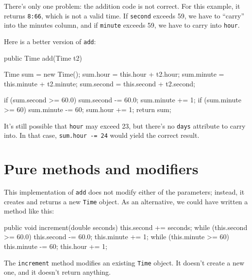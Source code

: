 \documentclass[12pt]{book}
\theoremstyle{exercise}
\newcommand{\java}[1]{\verb"#1"}
\begin{document}


There's only one problem: the addition code is not correct.
For this example, it returns {\tt 8:66}, which is not a valid time.
If \java{second} exceeds 59, we have to ``carry'' into the minutes column, and if \java{minute} exceeds 59, we have to carry into \java{hour}.

Here is a better version of \java{add}:

\begin{code}
    public Time add(Time t2) {
        Time sum = new Time();
        sum.hour = this.hour + t2.hour;
        sum.minute = this.minute + t2.minute;
        sum.second = this.second + t2.second;

        if (sum.second >= 60.0) {
            sum.second -= 60.0;
            sum.minute += 1;
        }
        if (sum.minute >= 60) {
            sum.minute -= 60;
            sum.hour += 1;
        }
        return sum;
    }
\end{code}

It's still possible that \java{hour} may exceed 23, but there's no \java{days} attribute to carry into.
In that case, \java{sum.hour -= 24} would yield the correct result.


\section{Pure methods and modifiers}

This implementation of \java{add} does not modify either of the parameters; instead, it creates and returns a new \java{Time} object.
As an alternative, we could have written a method like this:

\begin{code}
    public void increment(double seconds) {
        this.second += seconds;
        while (this.second >= 60.0) {
            this.second -= 60.0;
            this.minute += 1;
        }
        while (this.minute >= 60) {
            this.minute -= 60;
            this.hour += 1;
        }
    }
\end{code}

The \java{increment} method modifies an existing \java{Time} object.
It doesn't create a new one, and it doesn't return anything.

\end{document}
